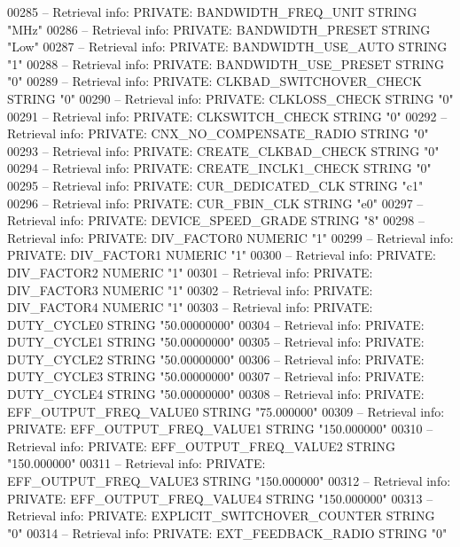 \begin{DoxyCode}
{00285 \textcolor{keyword}{-- Retrieval info: PRIVATE: BANDWIDTH\_FREQ\_UNIT STRING "MHz"}
00286 \textcolor{keyword}{-- Retrieval info: PRIVATE: BANDWIDTH\_PRESET STRING "Low"}
00287 \textcolor{keyword}{-- Retrieval info: PRIVATE: BANDWIDTH\_USE\_AUTO STRING "1"}
00288 \textcolor{keyword}{-- Retrieval info: PRIVATE: BANDWIDTH\_USE\_PRESET STRING "0"}
00289 \textcolor{keyword}{-- Retrieval info: PRIVATE: CLKBAD\_SWITCHOVER\_CHECK STRING "0"}
00290 \textcolor{keyword}{-- Retrieval info: PRIVATE: CLKLOSS\_CHECK STRING "0"}
00291 \textcolor{keyword}{-- Retrieval info: PRIVATE: CLKSWITCH\_CHECK STRING "0"}
00292 \textcolor{keyword}{-- Retrieval info: PRIVATE: CNX\_NO\_COMPENSATE\_RADIO STRING "0"}
00293 \textcolor{keyword}{-- Retrieval info: PRIVATE: CREATE\_CLKBAD\_CHECK STRING "0"}
00294 \textcolor{keyword}{-- Retrieval info: PRIVATE: CREATE\_INCLK1\_CHECK STRING "0"}
00295 \textcolor{keyword}{-- Retrieval info: PRIVATE: CUR\_DEDICATED\_CLK STRING "c1"}
00296 \textcolor{keyword}{-- Retrieval info: PRIVATE: CUR\_FBIN\_CLK STRING "e0"}
00297 \textcolor{keyword}{-- Retrieval info: PRIVATE: DEVICE\_SPEED\_GRADE STRING "8"}
00298 \textcolor{keyword}{-- Retrieval info: PRIVATE: DIV\_FACTOR0 NUMERIC "1"}
00299 \textcolor{keyword}{-- Retrieval info: PRIVATE: DIV\_FACTOR1 NUMERIC "1"}
00300 \textcolor{keyword}{-- Retrieval info: PRIVATE: DIV\_FACTOR2 NUMERIC "1"}
00301 \textcolor{keyword}{-- Retrieval info: PRIVATE: DIV\_FACTOR3 NUMERIC "1"}
00302 \textcolor{keyword}{-- Retrieval info: PRIVATE: DIV\_FACTOR4 NUMERIC "1"}
00303 \textcolor{keyword}{-- Retrieval info: PRIVATE: DUTY\_CYCLE0 STRING "50.00000000"}
00304 \textcolor{keyword}{-- Retrieval info: PRIVATE: DUTY\_CYCLE1 STRING "50.00000000"}
00305 \textcolor{keyword}{-- Retrieval info: PRIVATE: DUTY\_CYCLE2 STRING "50.00000000"}
00306 \textcolor{keyword}{-- Retrieval info: PRIVATE: DUTY\_CYCLE3 STRING "50.00000000"}
00307 \textcolor{keyword}{-- Retrieval info: PRIVATE: DUTY\_CYCLE4 STRING "50.00000000"}
00308 \textcolor{keyword}{-- Retrieval info: PRIVATE: EFF\_OUTPUT\_FREQ\_VALUE0 STRING "75.000000"}
00309 \textcolor{keyword}{-- Retrieval info: PRIVATE: EFF\_OUTPUT\_FREQ\_VALUE1 STRING "150.000000"}
00310 \textcolor{keyword}{-- Retrieval info: PRIVATE: EFF\_OUTPUT\_FREQ\_VALUE2 STRING "150.000000"}
00311 \textcolor{keyword}{-- Retrieval info: PRIVATE: EFF\_OUTPUT\_FREQ\_VALUE3 STRING "150.000000"}
00312 \textcolor{keyword}{-- Retrieval info: PRIVATE: EFF\_OUTPUT\_FREQ\_VALUE4 STRING "150.000000"}
00313 \textcolor{keyword}{-- Retrieval info: PRIVATE: EXPLICIT\_SWITCHOVER\_COUNTER STRING "0"}
00314 \textcolor{keyword}{-- Retrieval info: PRIVATE: EXT\_FEEDBACK\_RADIO STRING "0"}
}
\end{DoxyCode}
